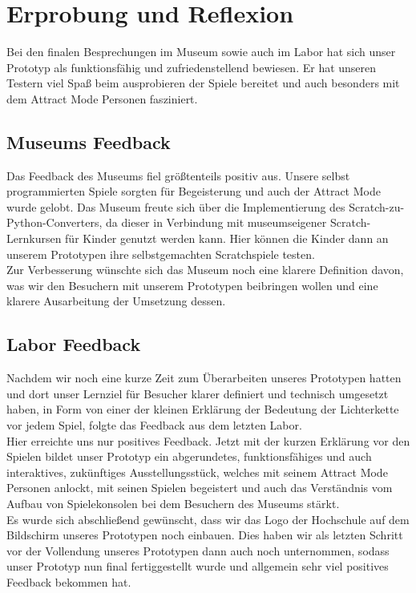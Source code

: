 \section{Erprobung und Reflexion}
Bei den finalen Besprechungen im Museum sowie auch im Labor hat sich unser Prototyp als funktionsfähig und zufriedenstellend bewiesen. Er hat unseren Testern viel Spaß beim ausprobieren der Spiele bereitet und auch besonders mit dem Attract Mode Personen fasziniert. \\

\subsection{Museums Feedback}
Das Feedback des Museums fiel größtenteils positiv aus. Unsere selbst programmierten Spiele sorgten für Begeisterung und auch der Attract Mode wurde gelobt. Das Museum freute sich über die Implementierung des Scratch-zu-Python-Converters, da dieser in Verbindung mit museumseigener Scratch-Lernkursen für Kinder genutzt werden kann. Hier können die Kinder dann an unserem Prototypen ihre selbstgemachten Scratchspiele testen. \\
Zur Verbesserung wünschte sich das Museum noch eine klarere Definition davon, was wir den Besuchern mit unserem Prototypen beibringen wollen und eine klarere Ausarbeitung der Umsetzung dessen.

\subsection{Labor Feedback}
Nachdem wir noch eine kurze Zeit zum Überarbeiten unseres Prototypen hatten und dort unser Lernziel für Besucher klarer definiert und technisch umgesetzt haben, in Form von einer der kleinen Erklärung der Bedeutung der Lichterkette vor jedem Spiel, folgte das Feedback aus dem letzten Labor. \\
Hier erreichte uns nur positives Feedback. Jetzt mit der kurzen Erklärung vor den Spielen bildet unser Prototyp ein abgerundetes, funktionsfähiges und auch interaktives, zukünftiges Ausstellungsstück, welches mit seinem Attract Mode Personen anlockt, mit seinen Spielen begeistert und auch das Verständnis vom Aufbau von Spielekonsolen bei dem Besuchern des Museums stärkt.\\
Es wurde sich abschließend gewünscht, dass wir das Logo der Hochschule auf dem Bildschirm unseres Prototypen noch einbauen. Dies haben wir als letzten Schritt vor der Vollendung unseres Prototypen dann auch noch unternommen, sodass unser Prototyp nun final fertiggestellt wurde und allgemein sehr viel positives Feedback bekommen hat. 

